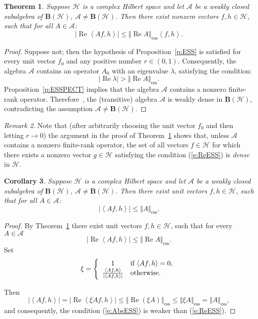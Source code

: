 \documentclass{tran-l}
\newtheorem{thm}{Theorem}[subsection]
\newtheorem{cor}[thm]{Corollary}
\theoremstyle{definition}
\theoremstyle{remark}
\newtheorem{rem}[thm]{Remark}
\numberwithin{equation}{subsection}
\DeclareMathOperator{\RE}{Re}
\DeclareMathOperator{\ess}{ess}
\newcommand{\To}{\longrightarrow}
\newcommand{\h}{\mathcal{H}}
\newcommand{\A}{\mathcal{A}}
\newcommand{\BH}{\mathbf{B}(\mathcal{H})}
\newcommand{\abs}[1]{\left\vert#1\right\vert}
\newcommand{\seq}[1]{\left<#1\right>}
\newcommand{\norm}[1]{\left\Vert#1\right\Vert}
\newcommand{\essnorm}[1]{\norm{#1}_{\ess}}
\begin{document}
\begin{thm}\label{t:UNIFBURN}
Suppose $\h$ is a complex Hilbert space and let $\A$ be a weakly closed subalgebra of $\BH$, $\A\neq\BH$. Then there exist nonzero vectors $f,h\in\h$, such that for all $A\in\A$:
\begin{equation}\label{e:ReESS}
  \abs{\RE\seq{A f,h}}\leq\essnorm{\RE A}\seq{f,h}.
\end{equation}
\end{thm}

\begin{proof}
Suppose not; then the hypothesis of Proposition~\ref{p:ESS} is satisfied for every unit vector $f_0$ and any positive number $r\in(0,1)$. Consequently, the algebra $\A$ contains an operator $A_0$ with an eigenvalue $\lambda$, satisfying the condition:
\[ \abs{\RE\lambda}>\essnorm{\RE{A}}. \]
Proposition~\ref{p:ESSPECT} implies that the algebra $\A$ contains a nonzero finite-rank operator. Therefore~\cite[Theorem~8.2]{RR73}, the (transitive) algebra $\A$ is weakly dense in $\BH$, contradicting the assumption $\A\neq\BH$.
\end{proof}

\begin{rem}
Note that (after arbitrarily choosing the unit vector $f_0$ and then letting $r\To0$) the argument in the proof of Theorem~\ref{t:UNIFBURN} shows that, unless $\A$ contains a nonzero finite-rank operator, the set of all vectors $f\in\h$ for which there exists a nonzero vector $g\in\h$ satisfying the condition (\ref{e:ReESS}) is \emph{dense} in $\h$.
\end{rem}

\begin{cor}\label{c:UNIFBURN}
Suppose $\h$ is a complex Hilbert space and let $\A$ be a weakly closed subalgebra of $\BH$, $\A\neq\BH$. Then there exist \emph{unit} vectors $f,h\in\h$, such that for all $A\in\A$:
\begin{equation}\label{e:AbsESS}
  \abs{\seq{A f,h}}\leq\essnorm{A}.
\end{equation}
\end{cor}

\begin{proof}
By Theorem~\ref{t:UNIFBURN} there exist unit vectors $f,h\in\h$, such that for every $A\in\A$
\[ \abs{\RE{\seq{A f,h}}}\leq\essnorm{\RE{A}}. \]
Set
\[ \xi = \left\lbrace
  \begin{array}{c l}
    1 & \text{if $\seq{A{f},h}=0$},\\
    \tfrac{\seq{A{f},h}}{\abs{\seq{A{f},h}}} & \text{otherwise}.
  \end{array}
\right. \]

Then
\[ \abs{\seq{A f,h}} = \abs{\RE\seq{\xi A f,h}}
   \leq \essnorm{\RE(\xi A)}
   \leq \essnorm{\xi A}
   = \essnorm{A}, \]
and consequently, the condition (\ref{e:AbsESS}) is weaker than (\ref{e:ReESS}).
\end{proof}
\end{document}
